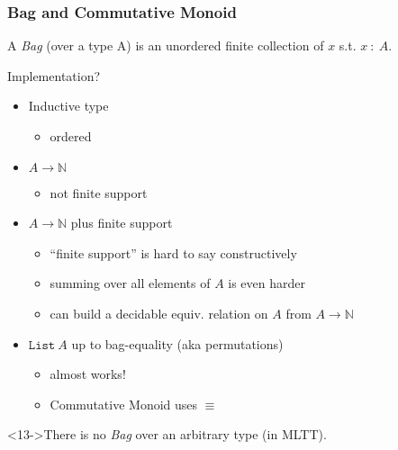 \documentclass[serif,mathserif,professionalfont,10pt]{beamer}
\begin{document}
\begin{frame}
\frametitle{Bag and Commutative Monoid}
\begin{definition}
A \emph{Bag} (over a type A) is an unordered finite collection
of $x$ s.t. $x~:~A$.
\end{definition}
\pause
Implementation?
\begin{itemize}
\item<2-> Inductive type
\begin{itemize}
\item<3-> ordered
\end{itemize}
\item<4-> $A \rightarrow \mathbb{N}$
\begin{itemize}
\item<5-> not finite support
\end{itemize}
\item<6-> $A \rightarrow \mathbb{N}$ plus finite support
\begin{itemize}
\item<7-> ``finite support'' is hard to say constructively
\item<8-> summing over all elements of $A$ is even harder
\item<9-> can build a decidable equiv. relation on $A$ from $A \rightarrow \mathbb{N}$
\end{itemize}
\item<10-> $\texttt{List}\ A$ up to bag-equality (aka permutations)
\begin{itemize}
\item<11-> almost works!
\item<12-> Commutative Monoid uses $\equiv$
\end{itemize}
\end{itemize}
\begin{theorem}<13->There is no \emph{Bag} over an arbitrary type (in MLTT).
\end{theorem}
\end{frame}
\end{document}
